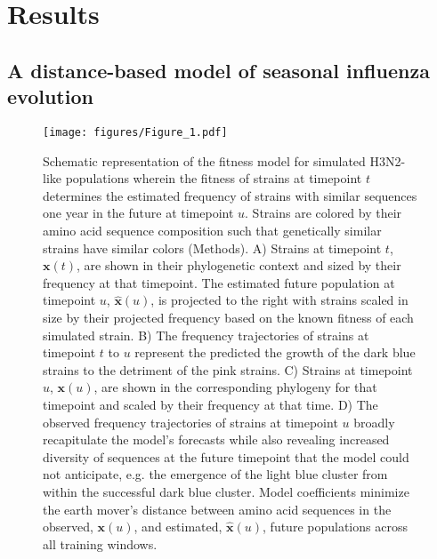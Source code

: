 \documentclass[9pt,lineno]{elife} %
\providecommand{\DIFaddbeginFL}{} %
\providecommand{\DIFaddendFL}{} %
\providecommand{\DIFdelbeginFL}{} %
\providecommand{\DIFdelendFL}{} %
\providecommand{\DIFaddbeginFL}{} %
\providecommand{\DIFaddendFL}{} %
\providecommand{\DIFdelbeginFL}{} %
\providecommand{\DIFdelendFL}{} %
\newcommand{\DIFscaledelfig}{0.5}
\newlength{\DIFdelgraphicswidth} %
\newlength{\DIFdelgraphicsheight} %
\newcommand{\DIFaddincludegraphics}[2][]{{\color{blue}\fbox{\DIFOincludegraphics[#1]{#2}}}} %
\newcommand{\DIFdelincludegraphics}[2][]{%
\sbox{\DIFdelgraphicsbox}{\DIFOincludegraphics[#1]{#2}}%
\settoboxwidth{\DIFdelgraphicswidth}{\DIFdelgraphicsbox} %
\settoboxtotalheight{\DIFdelgraphicsheight}{\DIFdelgraphicsbox} %
\scalebox{\DIFscaledelfig}{%
\parbox[b]{\DIFdelgraphicswidth}{\usebox{\DIFdelgraphicsbox}\\[-\baselineskip] \rule{\DIFdelgraphicswidth}{0em}}\llap{\resizebox{\DIFdelgraphicswidth}{\DIFdelgraphicsheight}{%
\setlength{\unitlength}{\DIFdelgraphicswidth}%
\begin{picture}(1,1)%
\thicklines\linethickness{2pt} %
{\color[rgb]{1,0,0}\put(0,0){\framebox(1,1){}}}%
{\color[rgb]{1,0,0}\put(0,0){\line( 1,1){1}}}%
{\color[rgb]{1,0,0}\put(0,1){\line(1,-1){1}}}%
\end{picture}%
}\hspace*{3pt}}} %
} %
\DeclareRobustCommand{\DIFaddbeginFL}{\DIFOaddbeginFL \let\includegraphics\DIFaddincludegraphics} %
\DeclareRobustCommand{\DIFaddendFL}{\DIFOaddendFL \let\includegraphics\DIFOincludegraphics} %
\DeclareRobustCommand{\DIFdelbeginFL}{\DIFOdelbeginFL \let\includegraphics\DIFdelincludegraphics} %
\DeclareRobustCommand{\DIFdelendFL}{\DIFOaddendFL \let\includegraphics\DIFOincludegraphics} %
\begin{document}
\section*{Results}

\subsection*{A distance-based model of seasonal influenza evolution}

\begin{figure}[htb]
  \begin{center}
  \DIFdelbeginFL %
\DIFdelendFL \DIFaddbeginFL \texttt{[image: figures/Figure\_1.pdf]}
  \DIFaddendFL \caption{
    Schematic representation of the fitness model for simulated H3N2-like populations wherein the fitness of strains at timepoint $t$ determines the estimated frequency of strains with similar sequences one year in the future at timepoint $u$.
    Strains are colored by their amino acid sequence composition such that genetically similar strains have similar colors (Methods).
    A) Strains at timepoint $t$, $\mathbf{x}(t)$, are shown in their phylogenetic context and sized by their frequency at that timepoint.
    The estimated future population at timepoint $u$, $\mathbf{\hat{x}}(u)$, is projected to the right with strains scaled in size by their projected frequency based on the known fitness of each simulated strain.
    B) The frequency trajectories of strains at timepoint $t$ to $u$ represent the predicted the growth of the dark blue strains to the detriment of the pink strains.
    C) Strains at timepoint $u$, $\mathbf{x}(u)$, are shown in the corresponding phylogeny for that timepoint and scaled by their frequency at that time.
    D) The observed frequency trajectories of strains at timepoint $u$ broadly recapitulate the model's forecasts while also revealing increased diversity of sequences at the future timepoint that the model could not anticipate, e.g. the emergence of the light blue cluster from within the successful dark blue cluster.
    Model coefficients minimize the earth mover's distance between amino acid sequences in the observed, $\mathbf{x}(u)$,  and estimated, $\mathbf{\hat{x}}(u)$, future populations across all training windows.
  }
  \label{fig:model}
  \end{center}
\end{figure}
\end{document}
